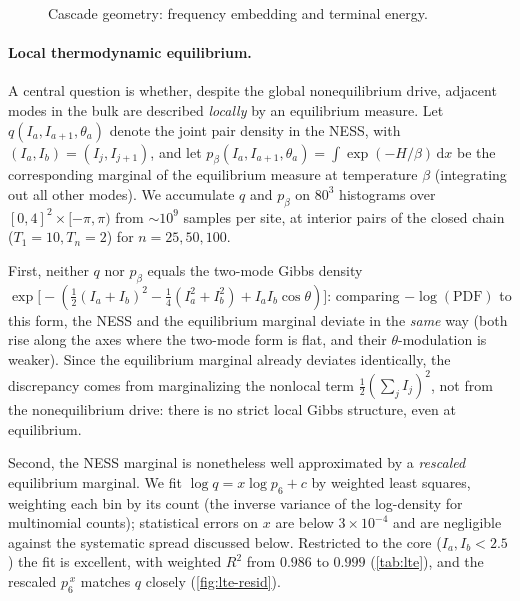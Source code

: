 \documentclass[11pt,a4paper]{article}
\theoremstyle{definition}
\numberwithin{equation}{section}   %
\begin{document}
\begin{figure}[ht]
  \centering
  \caption{Cascade geometry: frequency embedding and terminal energy.}
  \label{fig:embedding}
\end{figure}


\paragraph{Local thermodynamic equilibrium.}\label{par:lte}
A central question is whether, despite the global nonequilibrium drive,
adjacent modes in the bulk are described \emph{locally} by an equilibrium
measure. Let $q(I_a,I_{a+1},\theta_a)$ denote the joint pair density in the
NESS, with $(I_a,I_b)=(I_j,I_{j+1})$, and let
$p_\beta(I_a,I_{a+1},\theta_a)=\int \exp(-H/\beta)\,\mathrm dx$ be the
corresponding marginal of the equilibrium measure at temperature $\beta$
(integrating out all other modes). We accumulate $q$ and $p_\beta$ on
$80^3$ histograms over $[0,4]^2\times[-\pi,\pi)$ from $\sim10^9$ samples per
site, at interior pairs of the closed chain ($T_1=10,T_n=2$) for
$n=25,50,100$.

First, neither $q$ nor $p_\beta$ equals the two-mode Gibbs density
$\exp\!\big[-(\tfrac12(I_a{+}I_b)^2-\tfrac14(I_a^2{+}I_b^2)+I_aI_b\cos\theta)\big]$:
comparing $-\log(\text{PDF})$ to this form, the NESS and the equilibrium
marginal deviate in the \emph{same} way (both rise along the axes where the
two-mode form is flat, and their $\theta$-modulation is weaker). Since the
equilibrium marginal already deviates identically, the discrepancy comes from
marginalizing the nonlocal term $\tfrac12(\sum_j I_j)^2$, not from the
nonequilibrium drive: there is no strict local Gibbs structure, even at
equilibrium.

Second, the NESS marginal is nonetheless well approximated by a
\emph{rescaled} equilibrium marginal. We fit $\log q = x\log p_6 + c$ by
weighted least squares, weighting each bin by its count (the inverse variance
of the log-density for multinomial counts); statistical errors on $x$ are
below $3\times10^{-4}$ and are negligible against the systematic spread
discussed below. Restricted to the core ($I_a,I_b<2.5$) the fit is excellent,
with weighted $R^2$ from $0.986$ to $0.999$ (\cref{tab:lte}), and the rescaled
$p_6^{\,x}$ matches $q$ closely (\cref{fig:lte-resid}).
\end{document}
